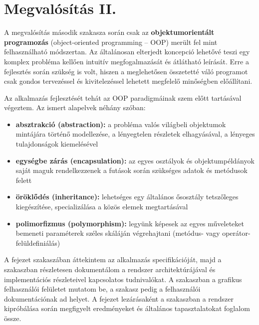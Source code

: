 \chapter{Megvalósítás II.}\label{sect:megvalositas_2}

A megvalósítás második szakasza során csak az \textbf{objektumorientált programozás} (object-oriented programming -- OOP) merült fel mint felhasználható módszertan. Az általánosan elterjedt koncepció lehetővé teszi egy komplex probléma kellően intuitív megfogalmazását és átlátható leírását. Erre a fejlesztés során szükség is volt, hiszen a meglehetősen összetetté váló programot csak gondos tervezéssel és kivitelezéssel lehetett megfelelő minőségben előállítani.

Az alkalmazás fejlesztését tehát az OOP paradigmáinak szem előtt tartásával végeztem. Az ismert alapelvek néhány szóban:

\begin{itemize}
  \item \textbf{absztrakció (abstraction):} a probléma valós világbeli objektumok mintájára történő modellezése, a lényegtelen részletek elhagyásával, a lényeges tulajdonságok kiemelésével
  \item \textbf{egységbe zárás (encapsulation):} az egyes osztályok és objektumpéldányok saját maguk rendelkezzenek a futások során szükséges adatok és metódusok felett
  \item \textbf{öröklődés (inheritance):} lehetséges egy általános ősosztály tetszőleges kiegészítése, specializálása a közös elemek megtartásával
  \item \textbf{polimorfizmus (polymorphism):} legyünk képesek az egyes műveleteket bemeneti paraméterek széles skáláján végrehajtani (metódus- vagy operátor-felüldefiniálás)
\end{itemize}

A fejezet  szakaszában áttekintem az alkalmazás specifikációját, majd a  szakaszban részletesen dokumentálom a rendszer architektúrájával és implementációs részleteivel kapcsolatos tudnivalókat. A  szakaszban a grafikus felhasználói felületet mutatom be, a  szakasz pedig a felhasználói dokumentációnak ad helyet. A fejezet lezárásaként a  szakaszban a rendszer kipróbálása során megfigyelt eredményeket és általános tapasztalatokat foglalom össze.


